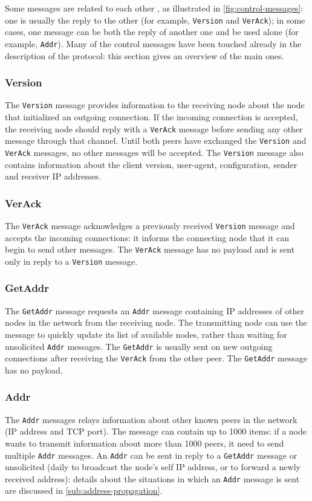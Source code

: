 Some messages are related to each other \cite{bitcoin_reference}, as illustrated in \cref{fig:control-messages}:
one is usually the reply to the other (for example, \texttt{Version} and \texttt{VerAck});
in some cases, one message can be both the reply of another one and be used alone (for example, \texttt{Addr}).
Many of the control messages have been touched already in the description of the protocol:
this section gives an overview of the main ones.

\subsubsection{Version}
\label{par:version}
The \texttt{Version} message provides information to the receiving node about the node that initialized an outgoing connection.
If the incoming connection is accepted, the receiving node should reply with a \texttt{VerAck} message before sending any other message through that channel.
Until both peers have exchanged the \texttt{Version} and \texttt{VerAck} messages, no other messages will be accepted.
The \texttt{Version} message also contains information about the client version, user-agent, configuration, sender and receiver IP addresses.

\subsubsection{VerAck}
The \texttt{VerAck} message acknowledges a previously received \texttt{Version} message and accepts the incoming connections:
it informs the connecting node that it can begin to send other messages.
The \texttt{VerAck} message has no payload and is sent only in reply to a \texttt{Version} message.

\subsubsection{GetAddr}
The \texttt{GetAddr} message requests an \texttt{Addr} message containing IP addresses of other nodes in the network from the receiving node.
The transmitting node can use the message to quickly update its list of available nodes, rather than waiting for unsolicited \texttt{Addr} messages.
The \texttt{GetAddr} is usually sent on new outgoing connections after receiving the \texttt{VerAck} from the other peer.
The \texttt{GetAddr} message has no payload.

\subsubsection{Addr}
The \texttt{Addr} messages relays information about other known peers in the network (IP address and TCP port).
The message can contain up to \num{1000} items:
if a node wants to transmit information about more than \num{1000} peers, it need to send multiple \texttt{Addr} messages.
An \texttt{Addr} can be sent in reply to a \texttt{GetAddr} message or unsolicited (daily to broadcast the node's self IP address, or to forward a newly received address):
details about the situations in which an \texttt{Addr} message is sent are discussed in \cref{sub:address-propagation}.

